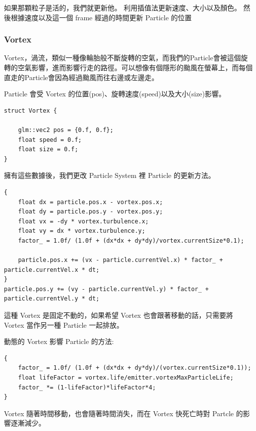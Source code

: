 如果那顆粒子是活的，我們就更新他。
利用插值法更新速度、大小以及顏色。
然後根據速度以及這一個 frame 經過的時間更新 Particle 的位置

\subsubsection{Vortex}

Vortex，渦流，類似一種像輪胎般不斷旋轉的空氣，而我們的Particle會被這個旋轉的空氣影響，進而影響行走的路徑。可以想像有個隱形的颱風在螢幕上，而每個直走的Particle會因為經過颱風而往右邊或左邊走。

Particle 會受 Vortex 的位置(pos)、旋轉速度(speed)以及大小(size)影響。

\begin{lstlisting}
struct Vortex {

    glm::vec2 pos = {0.f, 0.f};
    float speed = 0.f;
    float size = 0.f;
}
\end{lstlisting}

擁有這些數據後，我們更改 Particle System 裡 Particle 的更新方法。

\begin{lstlisting}
{
    float dx = particle.pos.x - vortex.pos.x;
    float dy = particle.pos.y - vortex.pos.y;
    float vx = -dy * vortex.turbulence.x;
    float vy = dx * vortex.turbulence.y;
    factor_ = 1.0f/ (1.0f + (dx*dx + dy*dy)/vortex.currentSize*0.1);

    particle.pos.x += (vx - particle.currentVel.x) * factor_ + particle.currentVel.x * dt;
}
particle.pos.y += (vy - particle.currentVel.y) * factor_ + particle.currentVel.y * dt;
\end{lstlisting}

這種 Vortex 是固定不動的，如果希望 Vortex 也會跟著移動的話，只需要將 Vortex 當作另一種 Particle 一起排放。

動態的 Vortex 影響 Particle 的方法:

\begin{lstlisting}
{
    factor_ = 1.0f/ (1.0f + (dx*dx + dy*dy)/(vortex.currentSize*0.1));
    float lifeFactor = vortex.life/emitter.vortexMaxParticleLife;
    factor_ *= (1-lifeFactor)*lifeFactor*4;
}
\end{lstlisting}

Vortex 隨著時間移動，也會隨著時間消失，而在 Vortex 快死亡時對 Partcle 的影響逐漸減少。


